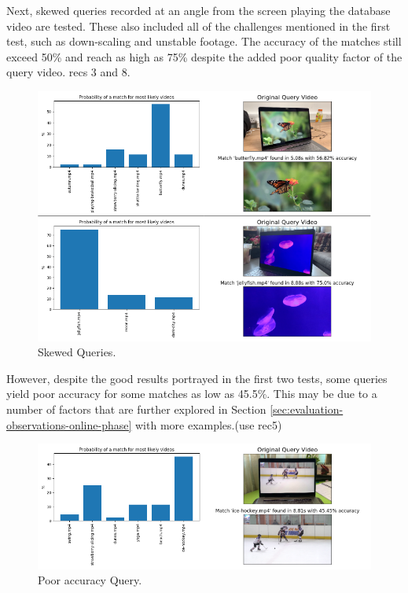 Next, skewed queries recorded at an angle from the screen playing the database video are tested. These also included all of the challenges mentioned in the first test, such as down-scaling and unstable footage. The accuracy of the matches still exceed 50\% and reach as high as 75\% despite the added poor quality factor of the query video. recs 3 and 8.

\begin{figure}[h] 
\centerline{\includegraphics[width=\textwidth]{figures/evaluation/skewed-queries.png}}
\caption{\label{fig:evaluation-skewed-queries}Skewed Queries.}
\end{figure}

However, despite the good results portrayed in the first two tests, some queries yield poor accuracy for some matches as low as 45.5\%. This may be due to a number of factors that are further explored in Section \ref{sec:evaluation-observations-online-phase} with more examples.(use rec5)\\

\begin{figure}[h] 
\centerline{\includegraphics[width=\textwidth]{figures/evaluation/poor-accuracy-query.png}}
\caption{\label{fig:evaluation-poor-accuracy-query}Poor accuracy Query.}
\end{figure}

